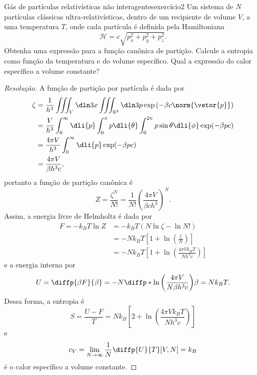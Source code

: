 \begin{exercício}{Gás de partículas relativísticas não interagentes}{exercício2}
    Um sistema de \(N\) partículas clássicas ultra-relativísticas, dentro de um recipiente de volume \(V\), a uma temperatura \(T\), onde cada partícula é definida pela Hamiltoniana
    \begin{equation*}
        \mathcal{H} = c\sqrt{p_x^2 + p_y^2 + p_z^2}.
    \end{equation*}
    Obtenha uma expressão para a função canônica de partição. Calcule a entropia como função da temperatura e do volume específico. Qual a expressão do calor específico a volume constante?
\end{exercício}
\begin{proof}[Resolução]
    A função de partição por partícula é dada por
    \begin{align*}
        \zeta &= \frac{1}{h^3}\iiint_{V} \dln3x \iiint_{\mathbb{R}^3} \dln3p \exp\left(-\beta c \norm{\vetor{p}}\right)\\
              &= \frac{V}{h^3} \int_0^\infty \dli{p} \int_0^{\pi} p \dli{\theta} \int_0^{2\pi} p\sin\theta \dli{\phi} \exp(- \beta pc)\\
              &= \frac{4\pi V}{h^3} \int_0^\infty \dli{p} \exp(- \beta pc)\\
              &= \frac{4\pi V}{ \beta h^3c},
    \end{align*}
    portanto a função de partição canônica é
    \begin{equation*}
        Z = \frac{\zeta^N}{N!} = \frac{1}{N!}\left(\frac{4\pi V}{ \beta c h^3}\right)^N.
    \end{equation*}
    Assim, a energia livre de Helmholtz é dada por
    \begin{align*}
        F = - k_BT \ln Z &= -k_BT\left(N \ln{\zeta} - \ln{N!}\right)\\
                         &= -N k_BT\left[1 + \ln\left(\frac{\zeta}{N}\right)\right]\\
                         &= -N k_B T\left[1 + \ln\left(\frac{4\pi V k_B T}{N h^3c}\right)\right]
    \end{align*}
    e a energia interna por
    \begin{equation*}
        U = \diffp{\beta F}{\beta} = -N \diffp*{\ln\left(\frac{4\pi V}{N \beta h^3 c}\right)}{\beta} = N k_B T.
    \end{equation*}
    Dessa forma, a entropia é
    \begin{equation*}
        S = \frac{U - F}{T} = N k_B\left[2 + \ln\left(\frac{4\pi V k_BT}{N h^3 c}\right)\right]
    \end{equation*}
    e
    \begin{equation*}
        c_V = \lim_{N \to \infty} \frac{1}{N}\diffp{U}{T}[V,N] = k_B
    \end{equation*}
    é o calor específico a volume constante.
\end{proof}

